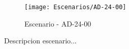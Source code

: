 \begin{figure}[H]
\centering
\texttt{[image: Escenarios/AD-24-00]}
\caption{Escenario - AD-24-00}
\label{fig:AD-24-00}
\end{figure}

Descripcion escenario...
\clearpage
